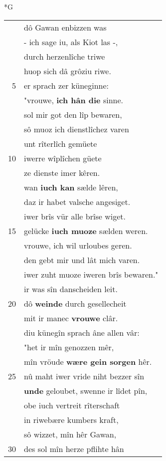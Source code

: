 \documentclass[8pt,a4paper,notitlepage]{article}
\begin{document}
\begin{table}[ht]
\begin{minipage}[t]{0.5\linewidth}
\small
\begin{center}*G
\end{center}
\begin{tabular}{rl}
 & dô Gawan enbizzen was\\ 
 & - ich sage iu, als Kiot las -,\\ 
 & durch herzenlîche triwe\\ 
 & huop sich dâ grôziu riwe.\\ 
5 & er sprach zer küneginne:\\ 
 & "vrouwe, \textbf{ich hân die} sinne.\\ 
 & sol mir got den lîp bewaren,\\ 
 & sô muoz ich dienstlîchez varen\\ 
 & unt rîterlîch gemüete\\ 
10 & iwerre wîplîchen güete\\ 
 & ze dienste imer kêren.\\ 
 & wan \textbf{iuch kan} sælde lêren,\\ 
 & daz ir habet valsche angesiget.\\ 
 & iwer brîs vür alle brîse wiget.\\ 
15 & gelücke \textbf{iuch muoze} sælden weren.\\ 
 & vrouwe, ich wil urloubes geren.\\ 
 & den gebt mir und lât mich varen.\\ 
 & iwer zuht muoze iweren brîs bewaren."\\ 
 & ir was sîn danscheiden leit.\\ 
20 & dô \textbf{weinde} durch gesellecheit\\ 
 & mit ir manec \textbf{vrouwe} clâr.\\ 
 & diu künegîn sprach âne allen vâr:\\ 
 & "het ir mîn genozzen mêr,\\ 
 & mîn vröude \textbf{wære gein sorgen} hêr.\\ 
25 & nû maht iwer vride niht bezzer sîn\\ 
 & \textbf{unde} geloubet, swenne ir lîdet pîn,\\ 
 & obe iuch vertreit rîterschaft\\ 
 & in riwebære kumbers kraft,\\ 
 & sô wizzet, mîn hêr Gawan,\\ 
30 & des sol mîn herze pflihte hân\\ 

\end{tabular}
\end{minipage}
\end{table}
\end{document}
